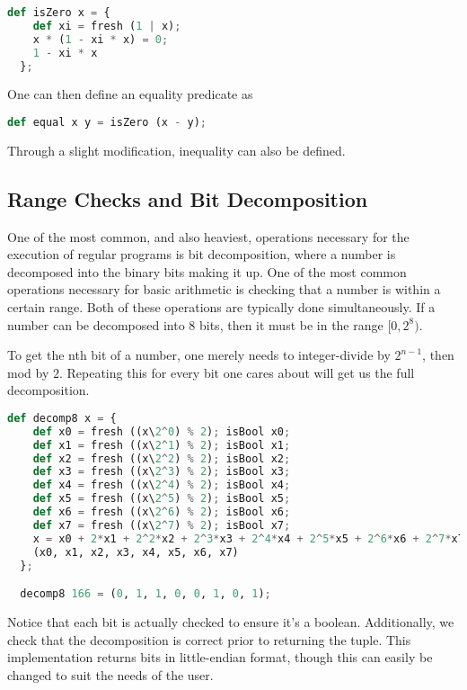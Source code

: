 \begin{lstlisting}[language=Python]
  def isZero x = {
    def xi = fresh (1 | x);
    x * (1 - xi * x) = 0;
    1 - xi * x
  };
\end{lstlisting}

One can then define an equality predicate as

\begin{lstlisting}[language=Python]
  def equal x y = isZero (x - y);
\end{lstlisting}

Through a slight modification, inequality can also be defined.



\subsection{Range Checks and Bit Decomposition}

One of the most common, and also heaviest, operations necessary for the execution of regular programs is bit decomposition, where a number is decomposed into the binary bits making it up. One of the most common operations necessary for basic arithmetic is checking that a number is within a certain range. Both of these operations are typically done simultaneously. If a number can be decomposed into 8 bits, then it must be in the range $[0, 2^8)$.

To get the nth bit of a number, one merely needs to integer-divide by $2^{n-1}$, then mod by $2$. Repeating this for every bit one cares about will get us the full decomposition.

\begin{lstlisting}[language=Python]
  def decomp8 x = {
    def x0 = fresh ((x\2^0) % 2); isBool x0;
    def x1 = fresh ((x\2^1) % 2); isBool x1;
    def x2 = fresh ((x\2^2) % 2); isBool x2;
    def x3 = fresh ((x\2^3) % 2); isBool x3;
    def x4 = fresh ((x\2^4) % 2); isBool x4;
    def x5 = fresh ((x\2^5) % 2); isBool x5;
    def x6 = fresh ((x\2^6) % 2); isBool x6;
    def x7 = fresh ((x\2^7) % 2); isBool x7;
    x = x0 + 2*x1 + 2^2*x2 + 2^3*x3 + 2^4*x4 + 2^5*x5 + 2^6*x6 + 2^7*x7;
    (x0, x1, x2, x3, x4, x5, x6, x7)
  };

  decomp8 166 = (0, 1, 1, 0, 0, 1, 0, 1);
\end{lstlisting}

Notice that each bit is actually checked to ensure it's a boolean. Additionally, we check that the decomposition is correct prior to returning the tuple. This implementation returns bits in little-endian format, though this can easily be changed to suit the needs of the user.

